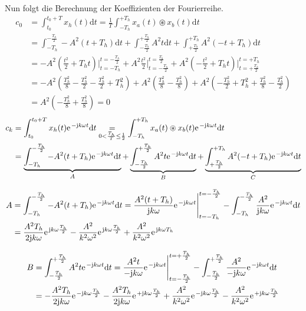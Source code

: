 \documentclass[11pt,a4paper,DIV=12]{scrartcl}
\newcommand{\diff}{\mathrm{d}}
\begin{document}
%
%
Nun folgt die Berechnung der Koeffizienten der Fourierreihe.
%
%
%
\begin{align}
	c_0&=\int_{t_0}^{t_0+T}x_{h}(t)\diff t=\frac{1}{T}\int_{-T_h}^{+T_h}x_{a}(t)\circledast x_{b}(t)\diff t \nonumber \\
	&=\int_{-T_h}^{-\frac{T_h}{2}}-A^2(t+T_h)\diff t+\int_{-\frac{T_h}{2}}^{+\frac{T_h}{2}}A^2t\diff t+\int_{+\frac{T_h}{2}}^{+T_h}A^2(-t+T_h)\diff t\nonumber \\
	&=-A^2\left(\frac{t^2}{2}+T_ht\right)\Bigg |_{t=-T_h}^{t=-\frac{T_h}{2}}+A^2\frac{t^2}{2}\Bigg |_{t=-\frac{T_h}{2}}^{t=\frac{T_h}{2}} + A^2\left(-\frac{t^2}{2}+T_ht\right)\Bigg |_{t=+\frac{T_h}{2}}^{t=+T_h} \nonumber \\
	&=-A^2\left(\frac{T_h^2}{8}-\frac{T_h^2}{2}-\frac{T_h^2}{2}+T_h^2\right)+A^2\left(\frac{T_h^2}{8}-\frac{T_h^2}{8}\right)+A^2\left(-\frac{T_h^2}{2}+T_h^2+\frac{T_h^2}{8}-\frac{T_h^2}{2}\right) \nonumber \\
	&=A^2\left (-\frac{T_h^2}{8}+\frac{T_h^2}{8}\right )=0
\end{align}
%
%
%
\begin{align}
	c_k&=\int_{t_0}^{t_0+T}x_{h}(t)\e^{-\im k \omega t}\diff t
	\underset{0<\frac{T_h}{T}\leq \frac{1}{2}}{=}\int_{-T_h}^{+T_h}x_{a}(t)\circledast x_{b}(t)\e^{-\im k \omega t}\diff t \nonumber \\
	&=\underbrace{\int_{-T_h}^{-\frac{T_h}{2}}-A^2(t+T_h)\e^{-\im k \omega t}\diff t}_A+\underbrace{\int_{-\frac{T_h}{2}}^{+\frac{T_h}{2}}A^2t\e^{-\im k \omega t}\diff t}_B+\underbrace{\int_{+\frac{T_h}{2}}^{+T_h}A^2(-t+T_h)\e^{-\im k \omega t}\diff t}_C
\end{align}
%

%
\begin{align}
	A&=\int_{-T_h}^{-\frac{T_h}{2}}-A^2(t+T_h)\e^{-\im k \omega t}\diff t=\frac{A^2(t+T_h)}{\im k \omega }\e^{-\im k \omega t}\Bigg |_{t=-T_h}^{t=-\frac{T_h}{2}}-\int_{-T_h}^{-\frac{T_h}{2}}\frac{A^2}{\im k \omega }\e^{-\im k \omega t}\diff t\nonumber \\
	&=\frac{A^2T_h}{2\im k \omega }\e^{\im k \omega \frac{T_h}{2}}-\frac{A^2}{k^2\omega^2}\e^{\im k \omega \frac{T_h}{2}}+\frac{A^2}{k^2\omega^2}\e^{\im k \omega T_h}
\end{align}
%

%
\begin{align}
	B&=\int_{-\frac{T_h}{2}}^{+\frac{T_h}{2}}A^2t\e^{-\im k \omega t}\diff t
	=\frac{A^2t}{-\im k \omega}\e^{-\im k \omega t}\Bigg |_{t=-\frac{T_h}{2}}^{t=+\frac{T_h}{2}}-\int_{-\frac{T_h}{2}}^{+\frac{T_h}{2}}\frac{A^2}{-\im k \omega}\e^{-\im k \omega t}\diff t\nonumber \\
	&=-\frac{A^2T_h}{2\im k \omega}\e^{-\im k \omega \frac{T_h}{2}}-\frac{A^2T_h}{2\im k \omega}\e^{+\im k \omega \frac{T_h}{2}}+\frac{A^2}{k^2\omega^2}\e^{-\im k \omega \frac{T_h}{2}}-\frac{A^2}{ k^2 \omega^2}\e^{+\im k \omega \frac{T_h}{2}}
\end{align}
%
\end{document}
